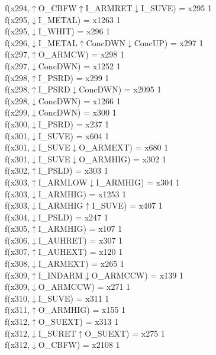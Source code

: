 f(x294,$\uparrow$O\_CBFW$\uparrow$I\_ARMRET$\downarrow$I\_SUVE) = x295 {1} \\
f(x295,$\downarrow$I\_METAL) = x1263 {1} \\
f(x295,$\downarrow$I\_WHIT) = x296 {1} \\
f(x296,$\downarrow$I\_METAL$\uparrow$ConcDWN$\downarrow$ConcUP) = x297 {1} \\
f(x297,$\uparrow$O\_ARMCW) = x298 {1} \\
f(x297,$\downarrow$ConcDWN) = x1252 {1} \\
f(x298,$\uparrow$I\_PSRD) = x299 {1} \\
f(x298,$\uparrow$I\_PSRD$\downarrow$ConcDWN) = x2095 {1} \\
f(x298,$\downarrow$ConcDWN) = x1266 {1} \\
f(x299,$\downarrow$ConcDWN) = x300 {1} \\
f(x300,$\downarrow$I\_PSRD) = x237 {1} \\
f(x301,$\downarrow$I\_SUVE) = x604 {1} \\
f(x301,$\downarrow$I\_SUVE$\downarrow$O\_ARMEXT) = x680 {1} \\
f(x301,$\downarrow$I\_SUVE$\downarrow$O\_ARMHIG) = x302 {1} \\
f(x302,$\uparrow$I\_PSLD) = x303 {1} \\
f(x303,$\uparrow$I\_ARMLOW$\downarrow$I\_ARMHIG) = x304 {1} \\
f(x303,$\downarrow$I\_ARMHIG) = x1253 {1} \\
f(x303,$\downarrow$I\_ARMHIG$\uparrow$I\_SUVE) = x407 {1} \\
f(x304,$\downarrow$I\_PSLD) = x247 {1} \\
f(x305,$\uparrow$I\_ARMHIG) = x107 {1} \\
f(x306,$\downarrow$I\_AUHRET) = x307 {1} \\
f(x307,$\uparrow$I\_AUHEXT) = x120 {1} \\
f(x308,$\downarrow$I\_ARMEXT) = x265 {1} \\
f(x309,$\uparrow$I\_INDARM$\downarrow$O\_ARMCCW) = x139 {1} \\
f(x309,$\downarrow$O\_ARMCCW) = x271 {1} \\
f(x310,$\downarrow$I\_SUVE) = x311 {1} \\
f(x311,$\uparrow$O\_ARMHIG) = x155 {1} \\
f(x312,$\uparrow$O\_SUEXT) = x313 {1} \\
f(x312,$\downarrow$I\_SURET$\uparrow$O\_SUEXT) = x275 {1} \\
f(x312,$\downarrow$O\_CBFW) = x2108 {1} \\
